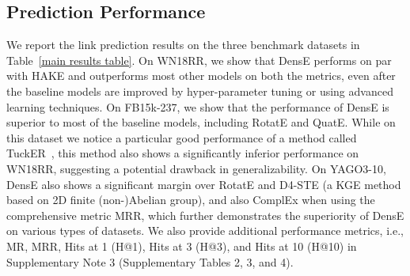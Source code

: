 \documentclass[11pt]{article}
\begin{document}
\subsection{Prediction Performance} We report the link prediction results on the three benchmark datasets in Table~\ref{main results table}. 
On WN18RR, we show that DensE performs on par with HAKE and outperforms most other models on both the metrics, even after the baseline models are improved by hyper-parameter tuning or using advanced learning techniques. 
On FB15k-237, we show that the performance of DensE is superior to most of the baseline models, including RotatE and QuatE. While on this dataset we notice a particular good performance of a method called TuckER~\cite{balavzevic2019tucker}, this method also shows a significantly inferior performance on WN18RR, suggesting a potential drawback in generalizability. 
On YAGO3-10, DensE also shows a significant margin over RotatE and D4-STE (a KGE method based on 2D finite (non-)Abelian group), and also ComplEx when using the comprehensive metric MRR, which further demonstrates the superiority of DensE on various types of datasets. We also provide additional performance metrics, i.e., MR, MRR, Hits at 1 (H@1), Hits at 3 (H@3), and Hits at 10 (H@10) in Supplementary Note 3 (Supplementary Tables 2, 3, and 4).
\end{document}
